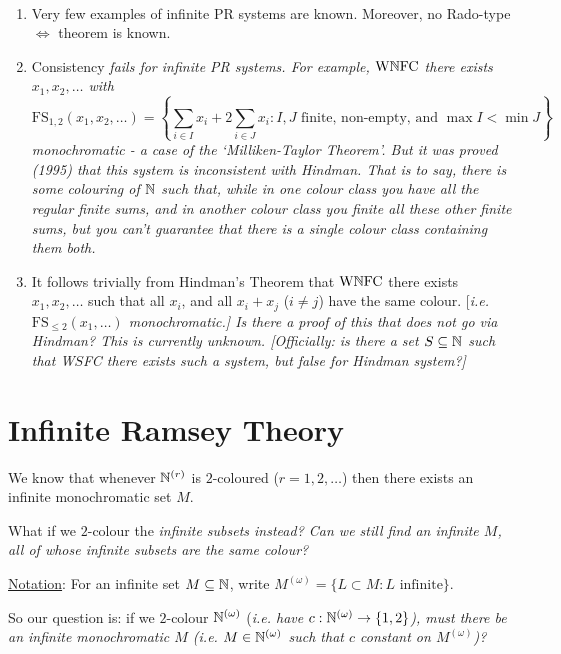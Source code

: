 \documentclass[10pt]{article}
\newcommand{\wnfc}{\textrm{W}\N\textrm{FC}}
\newcommand{\fs}{\textrm{FS}}
\newcommand{\om}{\omega}
\newcommand{\bom}{{(\omega)}}
\begin{document}
\begin{remark*}[Remarks]\ 
    \begin{enumerate}
        \item Very few examples of infinite PR systems are known. Moreover, no Rado-type $\iff$ theorem is known.
        \item Consistency \it{fails} for infinite PR systems. For example, $\wnfc$ there exists $x_1,x_2,\dots$ with $$\fs_{1,2}(x_1,x_2,\dots) = \left\{\sum_{i\in I}x_i + 2\sum_{i\in J}x_i:I,J\textrm{ finite, non-empty, and }\max I < \min J\right\}$$ monochromatic - a case of the `Milliken-Taylor Theorem'. But it was proved (1995) that this system is \it{inconsistent} with Hindman. That is to say, there is some colouring of $\mathbb{N}$ such that, while in one colour class you have all the regular finite sums, and in another colour class you finite all these other finite sums, but you can't guarantee that there is a single colour class containing them both.
        \item It follows trivially from Hindman's Theorem that $\wnfc$ there exists $x_1,x_2,\dots$ such that all $x_i$, and all $x_i + x_j$ ($i\ne j$) have the same colour. [\it{i.e.} $\fs_{\le 2}(x_1,\dots)$ monochromatic.] Is there a proof of this that does not go via Hindman? This is currently unknown. [Officially: is there a set $S\subseteq \mathbb{N}$ such that W$S$FC there exists such a system, but false for Hindman system?]
    \end{enumerate}
\end{remark*}


\section{Infinite Ramsey Theory}

We know that whenever $\mathbb{N}^{(r)}$ is $2$-coloured ($r = 1,2,\dots$) then there exists an infinite monochromatic set $M$.

What if we $2$-colour the \it{infinite} subsets instead? Can we still find an infinite $M$, all of whose infinite subsets are the same colour?

\underline{Notation}: For an infinite set $M\subseteq \mathbb{N}$, write $M^{(\om)} = \{L\subset M: L\textrm{ infinite}\}$.

So our question is: if we $2$-colour $\N^{(\om)}$ (\it{i.e.} have $c : \N^{(\om)} \ra \{1,2\}$), must there be an infinite monochromatic $M$ (\it{i.e.} $M \in \N^\bom $ such that $c$ constant on $M^\bom$)?
\end{document}

